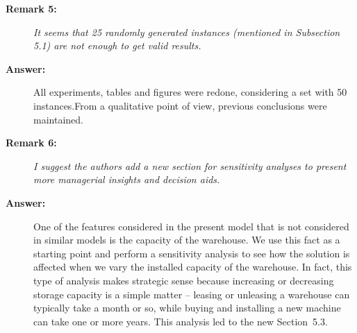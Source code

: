 \documentclass[11pt]{article}
\begin{document}
\begin{description}
\item[\textbf{Remark 5:}] \textit{It seems that 25 randomly generated instances (mentioned in Subsection 5.1) are not enough to get valid results.}

\item[\textbf{Answer:}] All experiments, tables and figures were redone, considering a set with 50 instances.From a qualitative point of view, previous conclusions were maintained.

\item[\textbf{Remark 6:}] \textit{I suggest the authors add a new section for sensitivity analyses to present more managerial insights and decision aids.}

\item[\textbf{Answer:}] One of the features considered in the present model that is not considered in similar models is the capacity of the warehouse. We use this fact as a starting point and perform a sensitivity analysis to see how the solution is affected when we vary the installed capacity of the warehouse. In fact, this type of analysis makes strategic sense because increasing or decreasing storage capacity is a simple matter -- leasing or unleasing a warehouse can typically take a month or so, while buying and installing a new machine can take one or more years. This analysis led to the new Section~5.3.

\end{description}
\end{document}
